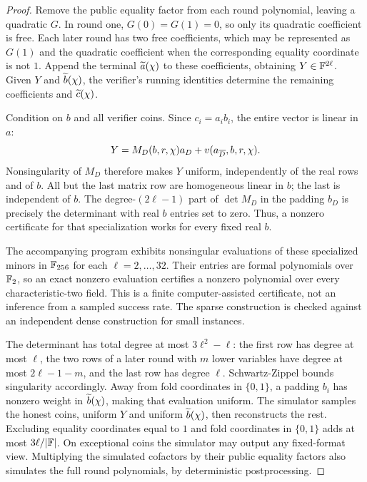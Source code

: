 \documentclass[11pt]{article}
\begin{document}
\begin{proof}
Remove the public equality factor from each round polynomial, leaving a quadratic $G$. In round one, $G(0)=G(1)=0$, so only its quadratic coefficient is free. Each later round has two free coefficients, which may be represented as $G(1)$ and the quadratic coefficient when the corresponding equality coordinate is not $1$. Append the terminal $\widetilde{a}(\chi)$ to these coefficients, obtaining $Y\in\mathbb{F}^{2\ell}$. Given $Y$ and $\widetilde{b}(\chi)$, the verifier's running identities determine the remaining coefficients and $\widetilde{c}(\chi)$.

Condition on $b$ and all verifier coins. Since $c_i=a_ib_i$, the entire vector is linear in $a$:
\[
 Y=M_D(b,r,\chi)a_D+v(a_{\overline D},b,r,\chi).
\]
Nonsingularity of $M_D$ therefore makes $Y$ uniform, independently of the real rows and of $b$. All but the last matrix row are homogeneous linear in $b$; the last is independent of $b$. The degree-$(2\ell-1)$ part of $\det M_D$ in the padding $b_D$ is precisely the determinant with real $b$ entries set to zero. Thus, a nonzero certificate for that specialization works for every fixed real $b$.

The accompanying program exhibits nonsingular evaluations of these specialized minors in $\mathbb{F}_{256}$ for each $\ell=2,\ldots,32$. Their entries are formal polynomials over $\mathbb{F}_2$, so an exact nonzero evaluation certifies a nonzero polynomial over every characteristic-two field. This is a finite computer-assisted certificate, not an inference from a sampled success rate. The sparse construction is checked against an independent dense construction for small instances.

The determinant has total degree at most $3\ell^2-\ell$: the first row has degree at most $\ell$, the two rows of a later round with $m$ lower variables have degree at most $2\ell-1-m$, and the last row has degree $\ell$. Schwartz-Zippel bounds singularity accordingly. Away from fold coordinates in $\{0,1\}$, a padding $b_i$ has nonzero weight in $\widetilde{b}(\chi)$, making that evaluation uniform. The simulator samples the honest coins, uniform $Y$ and uniform $\widetilde{b}(\chi)$, then reconstructs the rest. Excluding equality coordinates equal to $1$ and fold coordinates in $\{0,1\}$ adds at most $3\ell/|\mathbb{F}|$. On exceptional coins the simulator may output any fixed-format view. Multiplying the simulated cofactors by their public equality factors also simulates the full round polynomials, by deterministic postprocessing.
\end{proof}
\end{document}
